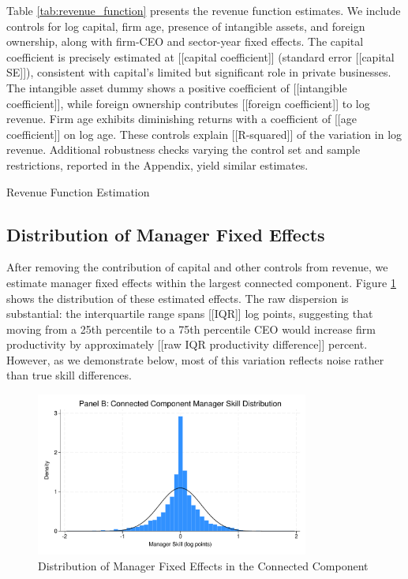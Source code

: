 \documentclass[11pt,a4paper]{article}
\begin{document}
Table \ref{tab:revenue_function} presents the revenue function estimates. We include controls for log capital, firm age, presence of intangible assets, and foreign ownership, along with firm-CEO and sector-year fixed effects. The capital coefficient is precisely estimated at [[capital coefficient]] (standard error [[capital SE]]), consistent with capital's limited but significant role in private businesses. The intangible asset dummy shows a positive coefficient of [[intangible coefficient]], while foreign ownership contributes [[foreign coefficient]] to log revenue. Firm age exhibits diminishing returns with a coefficient of [[age coefficient]] on log age. These controls explain [[R-squared]] of the variation in log revenue. Additional robustness checks varying the control set and sample restrictions, reported in the Appendix, yield similar estimates.

\begin{table}[htbp]
\centering
\caption{Revenue Function Estimation}
\label{tab:revenue_function}

\end{table}

\subsection{Distribution of Manager Fixed Effects}

After removing the contribution of capital and other controls from revenue, we estimate manager fixed effects within the largest connected component. Figure \ref{fig:manager_distribution} shows the distribution of these estimated effects. The raw dispersion is substantial: the interquartile range spans [[IQR]] log points, suggesting that moving from a 25th percentile to a 75th percentile CEO would increase firm productivity by approximately [[raw IQR productivity difference]] percent. However, as we demonstrate below, most of this variation reflects noise rather than true skill differences.

\begin{figure}[htbp]
\centering
\includegraphics[width=0.8\textwidth]{figure/manager_skill_connected.pdf}
\caption{Distribution of Manager Fixed Effects in the Connected Component}
\label{fig:manager_distribution}
\end{figure}
\end{document}
